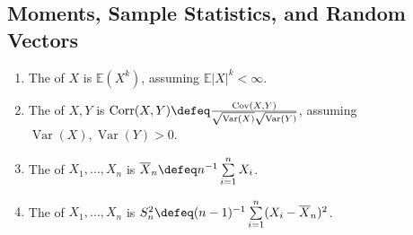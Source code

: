 \subsection{Moments, Sample Statistics, and Random Vectors}
\begin{definition} \label{def:moments-correlation-and-sample-statistics} 
\begin{enumerate}[label=(\roman*)]
\setlength{\itemsep}{0pt}
\item The  of $X$ is $\mathbb{E}(X^k)$, assuming $\mathbb{E}|X|^k<\infty$.
\item The  of $X,Y$ is $\operatorname{Corr}(X,Y)\defeq\frac{\operatorname{Cov}(X,Y)}{\sqrt{\operatorname{Var}(X)}\sqrt{\operatorname{Var}(Y)}}$, assuming $\operatorname{Var}(X),\operatorname{Var}(Y)>0$.
\item The  of $X_1,\ldots,X_n$ is $\overline{X}_n\defeq n^{-1}\sum\limits_{i=1}^{n}X_i$.
\item The  of $X_1,\ldots,X_n$ is $S_n^2\defeq(n-1)^{-1}\sum\limits_{i=1}^{n}(X_i-\overline{X}_n)^2$.
\end{enumerate}
\end{definition}

